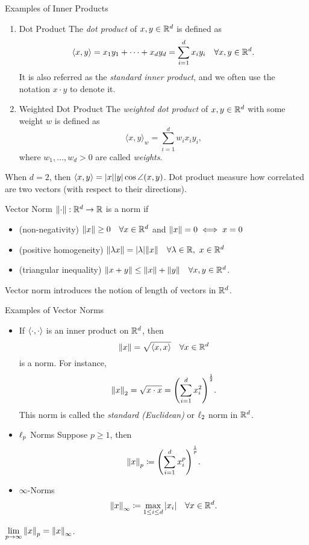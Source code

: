 \begin{eg}{Examples of Inner Products}
	\begin{enumerate}
		\item \begin{df}{Dot Product} The \textit{dot product} of $x,y\in{\mathbb{R}}^d$ is defined as \[\langle x,y\rangle=x_1y_1+\cdots+x_dy_d=\sum_{i=1}^dx_iy_i\quad\forall x,y\in{\mathbb{R}}^d.\] It is also referred as the \textit{standard inner product}, and we often use the notation $x\cdot y$ to denote it. \end{df}
		\item \begin{df}{Weighted Dot Product} The \textit{weighted dot product} of $x,y\in{\mathbb{R}}^d$ with some weight $w$ is defined as \[\langle x,y\rangle_w=\sum_{i=1}^dw_ix_iy_i,\] where $w_1,\dots,w_d>0$ are called \textit{weights}.\end{df}
	\end{enumerate}	
	\begin{rmk}
		When $d=2$, then $\langle x,y\rangle=\abs{x}\abs{y}\cos\angle(x,y)$. Dot product measure how correlated are two vectors (with respect to their directions). 	
	\end{rmk}
\end{eg}
\begin{df}{Vector Norm}
	$\norm{\cdot}:{\mathbb{R}}^d\to{\mathbb{R}}$ is a norm if
	\begin{itemize}
		\item (non-negativity) $\norm{x}\geq0\quad\forall x\in{\mathbb{R}}^d$ and $\norm{x}=0\iff x=0$
		\item (positive homogeneity) $\norm{\lambda x}=\abs{\lambda}\norm{x}\quad\forall\lambda\in\R,\ x\in\R^d$
		\item (triangular inequality) $\norm{x+y}\leq\norm{x}+\norm{y}\quad\forall x,y\in{\mathbb{R}}^d$.
	\end{itemize}
\end{df}
\begin{rmk}
	Vector norm introduces the notion of length of vectors in ${\mathbb{R}}^d$.	
\end{rmk}
\begin{eg}{Examples of Vector Norms}
	\begin{itemize}
		\item If $\left\langle \cdot, \cdot \right\rangle$ is an inner product on ${\mathbb{R}}^d$, then \[\norm{x}=\sqrt{\left\langle x, x \right\rangle}\quad\forall x\in{\mathbb{R}}^d\] is a norm. For instance, \[\norm{x}_2=\sqrt{x\cdot x}=\qty(\sum_{i=1}^dx_i^2)^{\frac{1}{2}}.\] This norm is called the \textit{standard (Euclidean)} or $\ell_2$ norm in ${\mathbb{R}}^d$.
		\item \begin{df}{$\ell_p$ Norms} Suppose $p\geq1$, then \[\norm{x}_p\coloneqq\qty(\sum_{i=1}^dx_i^p)^{\frac{1}{p}}.\]\end{df}
		\item \begin{df}{$\infty$-Norms}\[\norm{x}_\infty\coloneqq\max_{1\leq i\leq d}\abs{x_i}\quad\forall x\in{\mathbb{R}}^d.\]\end{df}
	\end{itemize}
	\begin{rmk}
		$\displaystyle\lim_{p\to\infty}\norm{x}_p=\norm{x}_{\infty}$.
	\end{rmk}
\end{eg}

